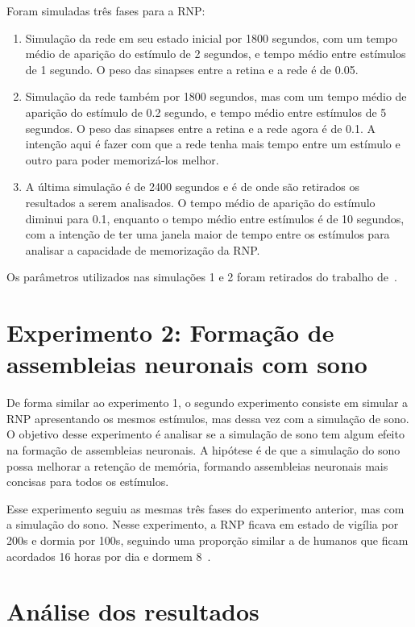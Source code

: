 Foram simuladas três fases para a RNP:\@

\begin{enumerate}
  \item Simulação da rede em seu estado inicial por 1800 segundos, com um tempo médio de aparição do estímulo de 2 segundos, e
  tempo médio entre estímulos de 1 segundo. O peso das sinapses entre a retina e a rede é de 0.05.
  \item Simulação da rede também por 1800 segundos, mas com um tempo médio de aparição do estímulo de 0.2 segundo, e
  tempo médio entre estímulos de 5 segundos. O peso das sinapses entre a retina e a rede agora é de 0.1. A intenção aqui é
  fazer com que a rede tenha mais tempo entre um estímulo e outro para poder memorizá-los melhor.
  \item A última simulação é de 2400 segundos e é de onde são retirados os resultados a serem analisados. O tempo médio de aparição do estímulo diminui
  para 0.1, enquanto o tempo médio entre estímulos é de 10 segundos, com a intenção de ter uma janela maior de tempo entre os
  estímulos para analisar a capacidade de memorização da RNP.\@
\end{enumerate}

Os parâmetros utilizados nas simulações 1 e 2 foram retirados do trabalho de~.

\section{Experimento 2: Formação de assembleias neuronais com sono}

De forma similar ao experimento 1, o segundo experimento consiste em simular a RNP apresentando os mesmos estímulos, mas dessa vez
com a simulação de sono. O objetivo desse experimento é analisar se a simulação de sono tem algum efeito na formação de
assembleias neuronais. A hipótese é de que a simulação do sono possa melhorar a retenção de memória, formando assembleias
neuronais mais concisas para todos os estímulos.

Esse experimento seguiu as mesmas três fases do experimento anterior, mas com a simulação do sono. Nesse experimento, a RNP ficava
em estado de vigília por 200s e dormia por 100s, seguindo uma proporção similar a de humanos que ficam acordados 16 horas por dia
e dormem 8~\cite{waterhouseDaily2012}.

\section{Análise dos resultados}

